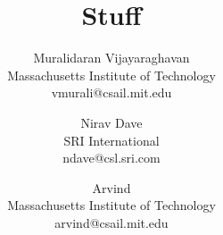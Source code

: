 
\title{Stuff
}



\author{
    Muralidaran Vijayaraghavan\\Massachusetts Institute of Technology\\vmurali@csail.mit.edu\and
    Nirav Dave\\SRI International\\ndave@csl.sri.com\and
    Arvind\\Massachusetts Institute of Technology\\arvind@csail.mit.edu
}

\date{}

\maketitle %


\begin{abstract}

\end{abstract}





